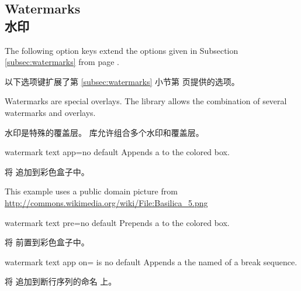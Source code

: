
\subsection{Watermarks\\水印}
The following option keys extend the options given in Subsection \ref{subsec:watermarks}
from page \pageref{subsec:watermarks}.

以下选项键扩展了第 \ref{subsec:watermarks} 小节第 \pageref{subsec:watermarks} 页提供的选项。
\begin{marker}
Watermarks are special overlays. The  library allows the combination
of several watermarks and overlays.

水印是特殊的覆盖层。  库允许组合多个水印和覆盖层。
\end{marker}

\begin{docTcbKey}{watermark text app}{=}{no default}
Appends a  to the colored box.

将  追加到彩色盒子中。
\begin{dispExample}

\begin{tcolorbox}[enhanced,title=My title,watermark graphics=Basilica_5.png,
  watermark opacity=0.25,
  watermark text app=Basilica,watermark color=Navy
  ]
\lipsum[1-2]
\tcblower
This example uses a public domain picture from\\
\url{http://commons.wikimedia.org/wiki/File:Basilica_5.png}
\end{tcolorbox}
\end{dispExample}
\end{docTcbKey}

\begin{docTcbKey}{watermark text pre}{=}{no default}
Prepends a  to the colored box.

将  前置到彩色盒子中。
\end{docTcbKey}

\begin{docTcbKey}{watermark text app on}{= is }{no default}
Appends a  the named  of a break sequence.

将  追加到断行序列的命名  上。
\end{docTcbKey}

